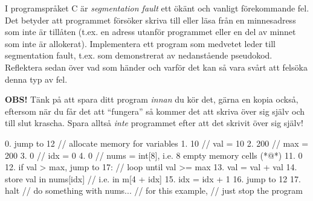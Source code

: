 \begin{Extrauppgifter}
    \item {}
    I programspråket C är \emph{segmentation fault} ett ökänt och vanligt förekommande fel. Det betyder att programmet försöker skriva till eller läsa från en minnesadress som inte är tillåten (t.ex. en adress utanför programmet eller en del av minnet som inte är allokerat).    
    Implementera ett program som medvetet leder till segmentation fault, t.ex. som demonstrerat av nedanstående pseudokod. Reflektera sedan över vad som händer och varför det kan så vara svårt att felsöka denna typ av fel.

    \halfblankline
    \textbf{OBS!} Tänk på att spara ditt program \emph{innan} du kör det, gärna en kopia också, eftersom när du får det att ``fungera'' så kommer det att skriva över sig själv och till slut krascha. Spara alltså \emph{inte} programmet efter att det skrivit över sig själv!



 
    \begin{Code}
        0. jump to 12  // allocate memory for variables
        1. 10          // val = 10
        2. 200         // max = 200
        3. 0           // idx = 0
        4. 0           // nums = int[8], i.e. 8 empty memory cells
        (*@\dots@*)
       11. 0
       12. if val > max, jump to 17:   // loop until val >= max
       13.     val = val + val
       14.     store val in nums[idx]  // i.e. in m[4 + idx]
       15.     idx = idx + 1
       16.     jump to 12
       17. halt                        // do something with nums...
                                       // for this example,
                                       // just stop the program
    \end{Code}

\end{Extrauppgifter}
